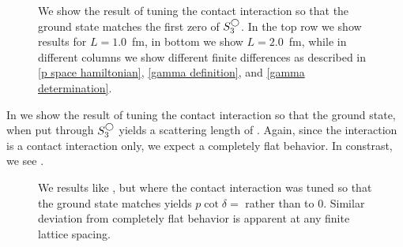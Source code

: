 
\begin{figure}[th]
    \scalebox{0.9}{}
    \caption{We show the result of tuning the contact interaction so that the ground state matches the first zero of $S^{\bigcirc}_3$.  In the top row we show results for $L=1.0$~fm, in bottom we show $L=2.0$~fm, while in different columns we show different finite differences as described in \eqref{p space hamiltonian}, \eqref{gamma definition}, and \eqref{gamma determination}. }
    \label{fig:unimproved spherical}
\end{figure}




In  we show the result of tuning the contact interaction so that the ground state, when put through $S^{\bigcirc}_3$ yields a scattering length of .
Again, since the interaction is a contact interaction only, we expect a completely flat behavior.
In constrast, we see .

\begin{figure}[th]
    \scalebox{0.9}{}
    \caption{We results like , but where the contact interaction was tuned so that the ground state matches yields $p\cot\delta = $ rather than to 0.  Similar deviation from completely flat behavior is apparent at any finite lattice spacing.}
    \label{fig:finite a spherical}
\end{figure}

\clearpage
